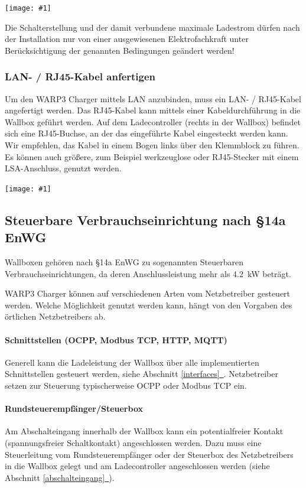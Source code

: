 \documentclass[a4paper,10pt]{article}
\newcommand{\hint}[1]{\begin{tcolorbox}[colback=boxgray,colframe=black,coltext=
white,title=Hinweis,left*=2mm,right*=2mm,boxsep=1mm,bottom=1mm,top=1mm]#1\end{tcolorbox}}
\newcommand{\gfx}[1]{\texttt{[image: \#1]}}
\newcommand*{\fullref}[1]{Abschnitt \hyperref[{#1}]{\ref*{#1}~\nameref*{#1}}}
\begin{document}
\begin{multicols*}{2}
    \gfx{./img_warp3/resized/warp3_switches.jpg}

    \hint{Die Schalterstellung und der damit verbundene maximale Ladestrom dürfen nach der
          Installation nur von einer ausgewiesenen Elektrofachkraft unter
          Berücksichtigung der genannten Bedingungen geändert werden!}

    \subsubsection{LAN- / RJ45-Kabel anfertigen}\label{ethernet} 

    Um den WARP3 Charger mittels LAN anzubinden, muss ein LAN- / RJ45-Kabel
    angefertigt werden. Das RJ45-Kabel kann mittels einer
    Kabeldurchführung in die Wallbox geführt werden. Auf dem Ladecontroller
	(rechts in der Wallbox) befindet sich eine RJ45-Buchse, an der das
	eingeführte Kabel eingesteckt werden kann. Wir empfehlen, das Kabel
	in einem Bogen links über den Klemmblock zu führen.
	Es können auch größere, zum Beispiel werkzeuglose oder RJ45-Stecker
	mit einem LSA-Anschluss, genutzt werden.

    \gfx{./img_warp3/resized/warp3_pro_open_highlighted_LAN.jpg} %

    \subsection{Steuerbare Verbrauchseinrichtung nach \S14a EnWG}\label{s14enwg}
    Wallboxen gehören nach \S14a EnWG zu sogenannten Steuerbaren
    Verbrauchseinrichtungen, da deren Anschlussleistung mehr als \SI{4,2}{\kilo\watt} beträgt.

    WARP3 Charger können auf verschiedenen Arten vom Netzbetreiber gesteuert werden.
    Welche Möglichkeit genutzt werden kann, hängt von den Vorgaben des örtlichen Netzbetreibers ab.

    \paragraph*{Schnittstellen (OCPP, Modbus TCP, HTTP, MQTT)}
    Generell kann die Ladeleistung der Wallbox über alle implementierten Schnittstellen gesteuert werden, siehe \fullref{interfaces}.
    Netzbetreiber setzen zur Steuerung typischerweise OCPP oder Modbus TCP ein.

    \paragraph*{Rundsteuerempfänger/Steuerbox}
    Am Abschalteingang innerhalb der Wallbox kann ein potentialfreier Kontakt (spannungsfreier Schaltkontakt)
    angeschlossen werden. Dazu muss eine Steuerleitung vom Rundsteuerempfänger
    oder der Steuerbox des Netzbetreibers in die Wallbox gelegt und am
	Ladecontroller angeschlossen werden (siehe \fullref{abschalteingang}).


\end{multicols*}
\end{document}
